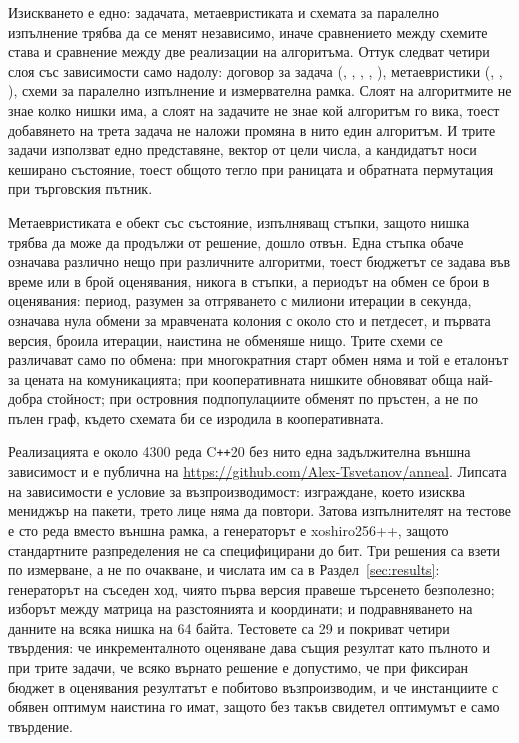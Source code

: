 Изискването е едно: задачата, метаевристиката и схемата за паралелно изпълнение трябва да се менят
независимо, иначе сравнението между схемите става и сравнение между две реализации на алгоритъма.
Оттук следват четири слоя със зависимости само надолу: договор за задача (,
, , , ), метаевристики (,
, ), схеми за паралелно изпълнение и измервателна рамка. Слоят на алгоритмите
не знае колко нишки има, а слоят на задачите не знае кой алгоритъм го вика, тоест добавянето на трета
задача не наложи промяна в нито един алгоритъм. И трите задачи използват едно представяне, вектор от
цели числа, а кандидатът носи кеширано състояние, тоест общото тегло при раницата и обратната
пермутация при търговския пътник.

Метаевристиката е обект със състояние, изпълняващ стъпки, защото нишка трябва да може да продължи от
решение, дошло отвън. Една стъпка обаче означава различно нещо при различните алгоритми, тоест
бюджетът се задава във време или в брой оценявания, никога в стъпки, а периодът на обмен се брои в
оценявания: период, разумен за отгряването с милиони итерации в секунда, означава нула обмени за
мравчената колония с около сто и петдесет, и първата версия, броила итерации, наистина не обменяше
нищо. Трите схеми се различават само по обмена: при многократния старт обмен няма и той е еталонът за
цената на комуникацията; при кооперативната нишките обновяват обща най-добра стойност; при островния
подпопулациите обменят по пръстен, а не по пълен граф, където схемата би се изродила в кооперативната.

Реализацията е около 4300 реда C\texttt{++}20 без нито една задължителна външна зависимост
 и е публична на \url{https://github.com/Alex-Tsvetanov/anneal}. Липсата на
зависимости е условие за възпроизводимост: изграждане, което изисква мениджър на пакети, трето лице
няма да повтори. Затова изпълнителят на тестове е сто реда вместо външна рамка, а генераторът е
xoshiro256++, защото стандартните разпределения не са специфицирани до бит. Три решения са взети по
измерване, а не по очакване, и числата им са в Раздел~\ref{sec:results}: генераторът на съседен ход,
чиято първа версия правеше търсенето безполезно; изборът между матрица на разстоянията и координати;
и подравняването на данните на всяка нишка на 64 байта. Тестовете са 29 и покриват четири твърдения:
че инкременталното оценяване дава същия резултат като пълното и при трите задачи, че всяко върнато
решение е допустимо, че при фиксиран бюджет в оценявания резултатът е побитово възпроизводим, и че
инстанциите с обявен оптимум наистина го имат, защото без такъв свидетел оптимумът е само твърдение.

